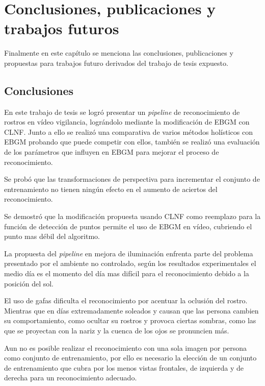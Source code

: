 \chapter{Conclusiones, publicaciones y trabajos futuros} \label{chap:Conclusiones}
Finalmente en este capítulo se menciona las conclusiones, publicaciones y propuestas para trabajos futuro derivados del trabajo de tesis expuesto.
\section{Conclusiones}

En este trabajo de tesis se logró presentar un \textit{pipeline} de reconocimiento de rostros en vídeo vigilancia, lográndolo mediante la modificación de \ac{EBGM} con \ac{CLNF}. Junto a ello se realizó una comparativa de varios métodos holísticos con \ac{EBGM} probando que puede competir con ellos, también se realizó una evaluación de los parámetros que influyen en \ac{EBGM} para mejorar el proceso de reconocimiento.

Se probó que las transformaciones de perspectiva para incrementar el conjunto de entrenamiento no tienen ningún efecto en el aumento de aciertos del reconocimiento.

Se demostró que la modificación propuesta usando \ac{CLNF} como reemplazo para la función de detección de puntos permite el uso de \ac{EBGM} en vídeo, cubriendo el punto mas débil del algoritmo.

La propuesta del \textit{pipeline} en mejora de iluminación enfrenta parte del problema presentado por el ambiente no controlado, según los resultados experimentales el medio día es el momento del día mas difícil para el reconocimiento debido a la posición del sol.

El uso de gafas dificulta el reconocimiento por acentuar la oclusión del rostro. Mientras que en días extremadamente soleados y causan que las persona cambien su comportamiento, como ocultar su rostros y provoca ciertas sombras, como las que se proyectan con la nariz y la cuenca de los ojos se pronuncien más. 


Aun no es posible realizar el reconocimiento con una sola imagen por persona como conjunto de entrenamiento, por ello es necesario la elección de un conjunto de entrenamiento que cubra por los menos vistas frontales, de izquierda y de derecha para un reconocimiento adecuado.%

